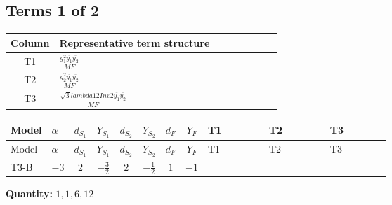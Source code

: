 \documentclass[8pt]{article}
\begin{document}
\begin{landscape}
\subsection*{Terms 1 of 2}
\begin{center}
\begin{tabular}{@{}c >{\raggedright\arraybackslash}p{0.82\linewidth}@{}}
\toprule
Column & Representative term structure \\
\midrule
T1 & \(\displaystyle \frac{g_{1}^{2} \overline{y_{1}} \overline{y_{2}}}{MF}\) \\
\midrule
T2 & \(\displaystyle \frac{g_{2}^{2} \overline{y_{1}} \overline{y_{2}}}{MF}\) \\
\midrule
T3 & \(\displaystyle \frac{\sqrt{3} lambda12Inv2 \overline{y_{1}} \overline{y_{2}}}{MF}\) \\
\midrule
\bottomrule
\end{tabular}
\end{center}
\smallskip
\tiny
\begin{longtable}{@{}llcccccc >{\raggedright\arraybackslash}p{0.21\linewidth} >{\raggedright\arraybackslash}p{0.21\linewidth} >{\raggedright\arraybackslash}p{0.21\linewidth}@{}}
\toprule
Model & $\alpha$ & $d_{S_1}$ & $Y_{S_1}$ & $d_{S_2}$ & $Y_{S_2}$ & $d_F$ & $Y_F$ & T1 & T2 & T3 \\
\midrule
\endfirsthead
\toprule
Model & $\alpha$ & $d_{S_1}$ & $Y_{S_1}$ & $d_{S_2}$ & $Y_{S_2}$ & $d_F$ & $Y_F$ & T1 & T2 & T3 \\
\midrule
\endhead
T3-B & $-3$ & $2$ & $-\frac{3}{2}$ & $2$ & $-\frac{1}{2}$ & $1$ & $-1$ & \scriptsize\adjustbox{max width=\linewidth}{$\begin{gathered} - \frac{3 g_{1}^{2} \overline{y_{1}} \overline{y_{2}}}{2 MF}\end{gathered}$} & \scriptsize\adjustbox{max width=\linewidth}{$\begin{gathered} - \frac{3 g_{2}^{2} \overline{y_{1}} \overline{y_{2}}}{4 MF}\end{gathered}$} & \scriptsize\adjustbox{max width=\linewidth}{$\begin{gathered} - \frac{\sqrt{3} lambda12Inv2 \overline{y_{1}} \overline{y_{2}}}{3 MF}\end{gathered}$} \\
\midrule
\bottomrule
\end{longtable}
\clearpage
\noindent\textbf{Quantity: }$\mathrm{1,1,6,12}$\par\smallskip

\end{landscape}
\end{document}

